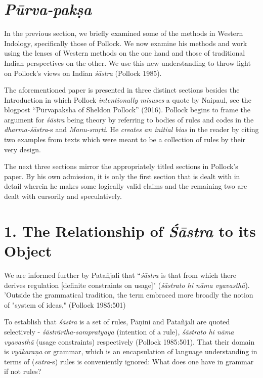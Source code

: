 \section*{{\sl\bfseries Pūrva-pakṣa}}

In the previous section, we briefly examined some of the methods in Western Indology, specifically those of Pollock.  We now examine his methods and work using the lenses of Western methods on the one hand and those of traditional Indian perspectives on the other. We use this new understanding to throw light on Pollock's views on Indian {\sl śāstra} (Pollock 1985).

The aforementioned paper is presented in three distinct sections besides the Introduction in which Pollock {\sl intentionally misuses} a quote by Naipaul, see the blogpost ``Pūrvapaksha of Sheldon Pollock'' (2016). Pollock begins to frame the argument for {\sl śāstra} being theory by referring to bodies of rules and codes in the {\sl dharma-śāstra}-s and {\sl Manu-smṛti}. He {\sl creates an initial bias} in the reader by citing two examples from texts which were meant to be a collection of rules by their very design.

The next three sections mirror the appropriately titled sections in Pollock's paper. By his own admission, it is only the first section that is dealt with in detail wherein he makes some logically valid claims and the remaining two are dealt with cursorily and speculatively.

\section*{1. The Relationship of {{\sl\bfseries Śāstra}\relax} to its Object}

We are informed further by Patañjali that  ``{\sl śāstra} is that from which there derives regulation [definite constraints on usage]" ({\sl śāstrato hi nāma vyavasthā}). 'Outside the grammatical tradition, the term embraced more broadly the notion of "system of ideas," (Pollock 1985:501)

To establish that {\sl śāstra} is a set of rules, Pāṇini and Patañjali are quoted selectively - {\sl śāstrārtha-sampratyaya} (intention of a rule), {\sl śāstrato hi nāma vyavasthā} (usage constraints) respectively (Pollock 1985:501). That their domain is {\sl vyākaraṇa} or grammar, which is an encapsulation of language understanding in terms of ({\sl sūtra}-s) rules is conveniently ignored: What does one have in grammar if not rules? 

